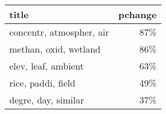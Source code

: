 \begin{tabular}{lr}
\toprule
                    title &  pchange \\
\midrule
 concentr, atmospher, air &      87\% \\
    methan, oxid, wetland &      86\% \\
      elev, leaf, ambient &      63\% \\
       rice, paddi, field &      49\% \\
      degre, day, similar &      37\% \\
\bottomrule
\end{tabular}
